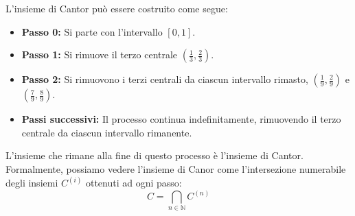 L'insieme di Cantor può essere costruito come segue:
\begin{itemize}
    \item \textbf{Passo 0:} Si parte con l'intervallo \([0,1]\).
    
    \begin{center}
    \end{center}

    \item \textbf{Passo 1:} Si rimuove il terzo centrale \(\left( \frac{1}{3}, \frac{2}{3} \right)\).
    
    \begin{center}
    \end{center}
    
    \item \textbf{Passo 2:} Si rimuovono i terzi centrali da ciascun intervallo rimasto, \(\left( \frac{1}{9}, \frac{2}{9} \right)\) e \(\left( \frac{7}{9}, \frac{8}{9} \right)\).
    
    \begin{center}
    \end{center}
    
    \item \textbf{Passi successivi:} Il processo continua indefinitamente, rimuovendo il terzo centrale da ciascun intervallo rimanente.
\end{itemize}
L'insieme che rimane alla fine di questo processo è l'insieme di Cantor.\\
Formalmente, possiamo vedere l'insieme di Canor come l'intersezione numerabile degli insiemi $C^{(i)}$ ottenuti ad ogni passo:
$$C=\bigcap_{n\in \mathbb N} C^{(n)}$$



